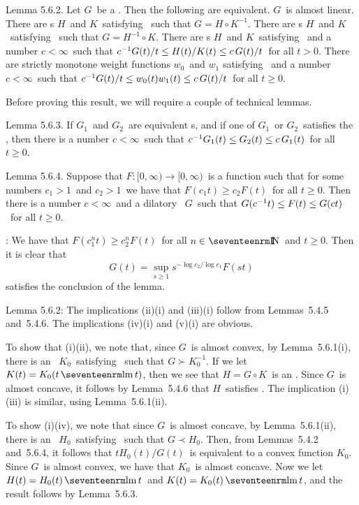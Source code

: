 \proclaim Lemma 5.6.2. Let $G$\ be a \phifunction. Then the following are
equivalent. \itemi $G$\ is almost linear.
\itemii There are \Nfunction s $H$\ and $K$\ satisfying \conditionJ\ such
that $G = H\circ K^{-1}$.
\itemiii There are \Nfunction s $H$\ and $K$\ satisfying \conditionJ\ such
that $G = H^{-1}\circ K$.
\itemiv There are \Nfunction s $H$\ and $K$\ satisfying \conditionJ\ and a
number $c<\infty$\ such that ${c^{-1}} G(t)/t \le H(t)/K(t) \le c\, G(t)/t $\
for all $t>0$.
\itemv There are strictly monotone weight functions $w_0$\ and
$w_1$ satisfying \conditionL\ and a number $c<\infty$\ such that $ {c^{-1}} G(t)/t
\le w_0(t) w_1(t) \le c\, G(t)/t $\ for all $t\ge 0$.
\moreproclaim

Before proving this result, we will require a couple of technical lemmas.

\proclaim Lemma 5.6.3. If $G_1$\ and $G_2$\ are equivalent \phifunction s, 
and if
one of $G_1$\ or $G_2$\ satisfies the \Deltacond, then there is a number
$c<\infty$\ such that ${c^{-1}} G_1(t) \le G_2(t) \le c\, G_1(t)$\ for all $t\ge
0$.

\proclaim Lemma 5.6.4. Suppose that $F:[0,\infty)\to[0,\infty)$\ is a function
such that for some numbers $c_1>1$\ and $c_2>1$\ we have that $F(c_1 t) \ge c_2
F(t)$\ for all $t\ge 0$. Then there is a number $c<\infty$\ and a dilatory
\phifunction\ $G$\ such that $G({c^{-1}} t) \le F(t) \le G(c t)$\ for all $t\ge0$.

\Proof: We have that $F(c_1^n t) \ge c_2^n F(t)$\ for all $n\in\N$\ and
$t\ge0$. Then it is clear that
$$ G(t) = \sup_{s\ge1} s^{-\log c_2/\log c_1} F(st) $$
satisfies the conclusion of the lemma.
\endproof

\Proofof Lemma 5.6.2: The implications (ii)\implies(i) and (iii)\implies(i)
follow from Lemmas~5.4.5 and~5.4.6. The implications (iv)\implies(i) and
(v)\implies(i) are obvious.

To show that (i)\implies(ii), we note that, since $G$\ is almost
convex, by Lemma~5.6.1(i), there is an \Nfunction\ $K_0$\ satisfying
\conditionJ\ such that $G\succ K_0^{-1}$. If we let $K(t) = K_0(t\lm t)$, then we
see that $H = G\circ K$\ is an \Nfunction. Since $G$\ is almost concave, it
follows by Lemma~5.4.6 that $H$\ satisfies \conditionJ.
The implication (i)\implies(iii) is similar, using Lemma~5.6.1(ii).

To show (i)\implies(iv), we note that since $G$\ is almost concave, by
Lemma~5.6.1(ii), there is an \Nfunction\ $H_0$\ satisfying 
\conditionJ\ such that
$G\prec H_0$. Then, from Lemmas~5.4.2 and~5.6.4, it follows that $tH_0(t)/G(t)$\
is equivalent to a convex function $K_0$. Since $G$\ is almost convex, we have
that $K_0$\ is almost concave. Now we let $H(t) = H_0(t)\lm t$\ and $K(t) =
K_0(t)\lm t$, and the result follows by Lemma~5.6.3.

